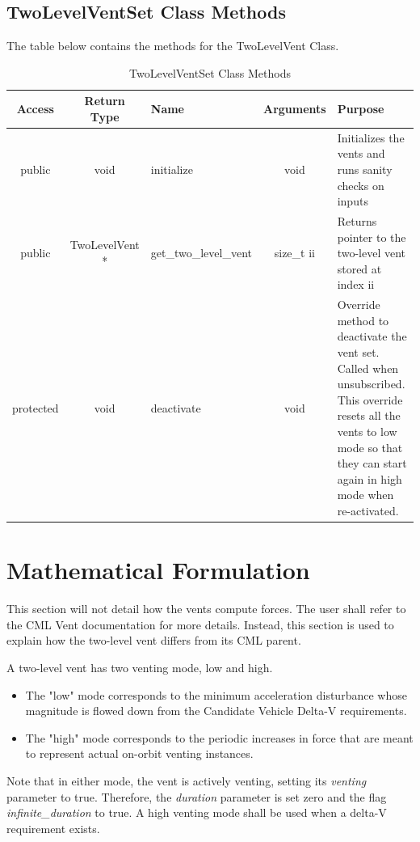 \documentclass[11pt,fleqn]{report}
\begin{document}
\subsection{TwoLevelVentSet Class Methods}
\noindent The table below contains the methods for the TwoLevelVent Class.

\begin{table}[!h]
    \caption{TwoLevelVentSet Class Methods}
    \begin{tabularx}{\textwidth}{|c|c|X|c|X|} \hline
    \textbf{Access} & \textbf{Return Type} & \textbf{Name} & \textbf{Arguments} & \textbf{Purpose} \\
    \hline
    public & void & initialize & void & Initializes the vents and runs sanity checks on inputs  \\
    \hline
    public & TwoLevelVent * & get\_two\_level\_vent & size\_t ii & Returns pointer to the two-level vent stored at index ii  \\
    \hline
    protected & void & deactivate & void & Override method to deactivate the vent set. Called when unsubscribed. This override 
    resets all the vents to low mode so that they can start again in high mode when re-activated.\\
    \hline
    \end{tabularx}
\end{table}

\section{Mathematical Formulation}

\noindent This section will not detail how the vents compute forces. The user shall refer to the CML Vent documentation 
for more details. Instead, this section is used to explain how the two-level vent differs from its CML parent. 

\noindent A two-level vent has two venting mode, low and high.
\begin{itemize}
    \item The "low" mode corresponds to the minimum acceleration disturbance whose magnitude is flowed down from the Candidate 
    Vehicle Delta-V requirements.
    \item The "high" mode corresponds to the periodic increases in force that are meant to represent actual on-orbit venting 
    instances.
\end{itemize}

Note that in either mode, the vent is actively venting, setting its \emph{venting} parameter to true. Therefore, the \emph{duration}
parameter is set zero and the flag \emph{infinite\_duration} to true. A high venting mode shall be used when a delta-V requirement 
exists.
\end{document}
